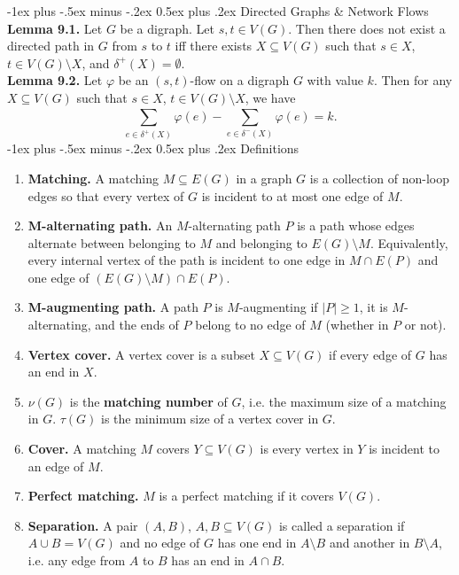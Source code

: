 \documentclass[10pt,landscape]{article}
\makeatletter
\renewcommand{\section}{\@startsection{section}{1}{0mm}%
                                {-1ex plus -.5ex minus -.2ex}%
                                {0.5ex plus .2ex}%
                                {\normalfont\large\bfseries}}
\makeatother
\begin{document}
\begin{multicols}{3}
\section{Directed Graphs \& Network Flows}
\textbf{Lemma 9.1.} Let \( G \) be a digraph. Let \( s, t \in V(G) \). Then there does not exist a directed path in \( G \) from \( s \) to \( t \) iff there exists \( X \subseteq V(G) \) such that \( s \in X \), \( t \in V(G) \setminus X \), and \( \delta ^{+}(X) = \emptyset   \). \\
\textbf{Lemma 9.2.} Let \( \varphi  \) be an \( (s,t) \)-flow on a digraph \( G \) with value \( k \). Then for any \( X \subseteq V(G) \) such that \( s \in X \), \( t \in V(G) \setminus X \), we have \[\sum_{e \in \delta ^{+}(X) }^{}\varphi (e) - \sum_{e \in \delta ^{-}(X)}^{}\varphi (e) = k.\]
\section{Definitions}
\begin{enumerate}
	\item \textbf{Matching.} A matching \( M \subseteq E(G) \) in a graph \( G \) is a collection of non-loop edges so that every vertex of \( G \) is incident to at most one edge of \( M \).
	\item \textbf{M-alternating path.} An \( M \)-alternating path \( P \) is a path whose edges alternate between belonging to \( M \) and belonging to \( E(G) \setminus M \). Equivalently, every internal vertex of the path is incident to one edge in \( M \cap E(P) \) and one edge of \( (E(G) \setminus M) \cap E(P). \)
	\item \textbf{M-augmenting path.} A path \( P \) is \( M \)-augmenting if \( |P| \geq 1 \), it is \( M \)-alternating, and the ends of \( P \) belong to no edge of \( M \) (whether in \( P \) or not).
	\item \textbf{Vertex cover.} A vertex cover is a subset \( X \subseteq V(G) \) if every edge of \( G \) has an end in \( X \).
	\item \( \nu (G) \) is the \textbf{matching number} of \( G \), i.e. the maximum size of a matching in \( G \). \( \tau (G) \) is the minimum size of a vertex cover in \( G \).
	\item \textbf{Cover.} A matching \( M \) covers \( Y \subseteq V(G) \) is every vertex in \( Y \) is incident to an edge of \( M \).
	\item \textbf{Perfect matching.} \( M \) is a perfect matching if it covers \( V(G) \).
	\item \textbf{Separation.} A pair \( (A,B) \), \( A,B \subseteq V(G) \) is called a separation if \( A \cup B = V(G) \) and no edge of \( G \) has one end in \( A \setminus B \) and another in \( B \setminus A \), i.e. any edge from \( A \) to \( B \) has an end in \( A \cap B \).

\end{enumerate}
\end{multicols}
\end{document}

